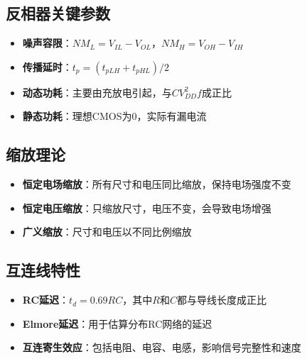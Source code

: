 \documentclass[UTF8,12pt,a4paper]{ctexart}
\begin{document}
\subsection*{反相器关键参数}

\begin{itemize}
    \item \textbf{噪声容限}：$NM_L = V_{IL} - V_{OL}$，$NM_H = V_{OH} - V_{IH}$
    \item \textbf{传播延时}：$t_p = (t_{pLH} + t_{pHL})/2$
    \item \textbf{动态功耗}：主要由充放电引起，与$CV_{DD}^2f$成正比
    \item \textbf{静态功耗}：理想CMOS为0，实际有漏电流
\end{itemize}

\subsection*{缩放理论}

\begin{itemize}
    \item \textbf{恒定电场缩放}：所有尺寸和电压同比缩放，保持电场强度不变
    \item \textbf{恒定电压缩放}：只缩放尺寸，电压不变，会导致电场增强
    \item \textbf{广义缩放}：尺寸和电压以不同比例缩放
\end{itemize}

\subsection*{互连线特性}

\begin{itemize}
    \item \textbf{RC延迟}：$t_d = 0.69RC$，其中$R$和$C$都与导线长度成正比
    \item \textbf{Elmore延迟}：用于估算分布RC网络的延迟
    \item \textbf{互连寄生效应}：包括电阻、电容、电感，影响信号完整性和速度
\end{itemize}
\end{document}
